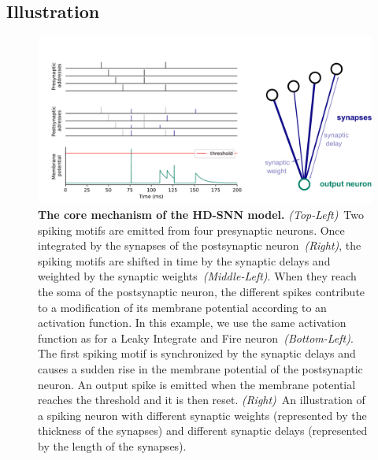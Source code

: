 \documentclass[landscape,a0]{a0poster}
\newcommand{\colorsubsec}{gray}
\begin{document}
\begin{multicols}{3}
\subsection*{\color{\colorsubsec}Illustration}
%
\begin{figure}[H]
    \centering
    \includegraphics[width=0.980\linewidth]{figures/HDSNN_graph.pdf}
    \caption{\textbf{The core mechanism of the HD-SNN model.} \textit{(Top-Left)}~Two spiking motifs are emitted from four presynaptic neurons. Once integrated by the synapses of the postsynaptic neuron~\textit{(Right)}, the spiking motifs are shifted in time by the synaptic delays and weighted by the synaptic weights~\textit{(Middle-Left)}. When they reach the soma of the postsynaptic neuron, the different spikes contribute to a modification of its membrane potential according to an activation function. In this example, we use the same activation function as for a Leaky Integrate and Fire neuron~\textit{(Bottom-Left)}. The first spiking motif is synchronized by the synaptic delays and causes a sudden rise in the membrane potential of the postsynaptic neuron. An output spike is emitted when the membrane potential reaches the threshold and it is then reset.   \textit{(Right)}~An illustration of a spiking neuron with different synaptic weights (represented by the thickness of the synapses) and different synaptic delays (represented by the length of the synapses). }%
    \label{fig:izhikevich}%
\end{figure}

\end{multicols}
\end{document}
